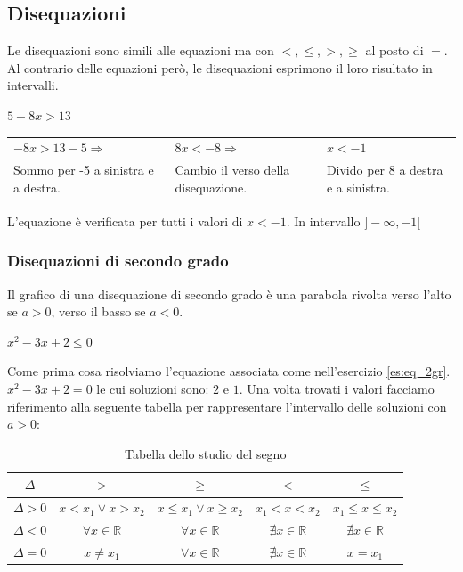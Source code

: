 \subsection*{Disequazioni}
Le disequazioni sono simili alle equazioni ma con $<,\leq,>,\geq$ al posto di $=$.
Al contrario delle equazioni però, le disequazioni esprimono il loro risultato in intervalli.
\begin{example}
$5-8x>13$
\begin{center}
\begin{tabular}{m{3cm} m{3cm} m{3cm}}
     $-8x>13-5\Rightarrow$ & $8x<-8\Rightarrow$ & $x<-1$\\
     Sommo per -5 a sinistra e a destra. & Cambio il verso della disequazione. & Divido per 8 a destra e a sinistra.
\end{tabular}
\end{center}

L'equazione è verificata per tutti i valori di $x<-1$. In intervallo $]-\infty,-1[$
\end{example}

\subsubsection*{Disequazioni di secondo grado}
Il grafico di una disequazione di secondo grado è una parabola rivolta verso l'alto se $a>0$, verso il basso se $a<0$.
\begin{example}
    $x^2-3x+2\leq 0$
    
    Come prima cosa risolviamo l'equazione associata come nell'esercizio \ref{es:eq_2gr}. $x^2-3x+2=0$ le cui soluzioni sono: $2$ e $1$.
    Una volta trovati i valori facciamo riferimento alla seguente tabella per rappresentare l'intervallo delle soluzioni con $a>0$:
\begin{table}[h]
    \centering
    \begin{tabular}{|c|c|c|c|c|}
        \hline$\Delta$ & $>$ & $\geq$ & $<$ & $\leq$\\\hline\hline
        $\Delta >0$ & $x<x_1 \vee x>x_2$ & $x\leq x_1 \vee x\geq x_2$ & $x_1<x<x_2$ & $x_1\leq x\leq x_2$\\\hline
        $\Delta <0$ & $\forall x\in\mathbb{R}$ & $\forall x\in\mathbb{R}$ & $\nexists x\in\mathbb{R}$ & $\nexists x\in\mathbb{R}$\\\hline
        $\Delta =0$ & $x\neq x_1$ & $\forall x\in\mathbb{R}$ & $\nexists x\in\mathbb{R}$ & $x=x_1$\\\hline
    \end{tabular}
    \caption{Tabella dello studio del segno}
    \label{tab:eq_2gr_sds}
\end{table}
\end{example}

